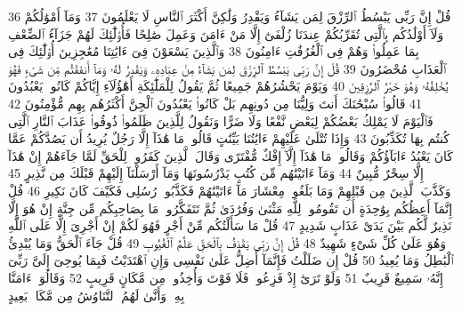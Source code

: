 {\tiny\colorbox{cl_aya}{36}} قُلْ إِنَّ رَبِّى يَبْسُطُ ٱلرِّزْقَ لِمَن يَشَآءُ وَيَقْدِرُ وَلَٰكِنَّ أَكْثَرَ ٱلنَّاسِ لَا يَعْلَمُونَ
{\tiny\colorbox{cl_aya}{37}} وَمَآ أَمْوَٰلُكُمْ وَلَآ أَوْلَٰدُكُم بِٱلَّتِى تُقَرِّبُكُمْ عِندَنَا زُلْفَىٰٓ إِلَّا مَنْ ءَامَنَ وَعَمِلَ صَٰلِحًا فَأُو۟لَٰٓئِكَ لَهُمْ جَزَآءُ ٱلضِّعْفِ بِمَا عَمِلُوا۟ وَهُمْ فِى ٱلْغُرُفَٰتِ ءَامِنُونَ
{\tiny\colorbox{cl_aya}{38}} وَٱلَّذِينَ يَسْعَوْنَ فِىٓ ءَايَٰتِنَا مُعَٰجِزِينَ أُو۟لَٰٓئِكَ فِى ٱلْعَذَابِ مُحْضَرُونَ
{\tiny\colorbox{cl_aya}{39}} قُلْ إِنَّ رَبِّى يَبْسُطُ ٱلرِّزْقَ لِمَن يَشَآءُ مِنْ عِبَادِهِۦ وَيَقْدِرُ لَهُۥ وَمَآ أَنفَقْتُم مِّن شَىْءٍ فَهُوَ يُخْلِفُهُۥ وَهُوَ خَيْرُ ٱلرَّٰزِقِينَ
{\tiny\colorbox{cl_aya}{40}} وَيَوْمَ يَحْشُرُهُمْ جَمِيعًا ثُمَّ يَقُولُ لِلْمَلَٰٓئِكَةِ أَهَٰٓؤُلَآءِ إِيَّاكُمْ كَانُوا۟ يَعْبُدُونَ
{\tiny\colorbox{cl_aya}{41}} قَالُوا۟ سُبْحَٰنَكَ أَنتَ وَلِيُّنَا مِن دُونِهِم بَلْ كَانُوا۟ يَعْبُدُونَ ٱلْجِنَّ أَكْثَرُهُم بِهِم مُّؤْمِنُونَ
{\tiny\colorbox{cl_aya}{42}} فَٱلْيَوْمَ لَا يَمْلِكُ بَعْضُكُمْ لِبَعْضٍ نَّفْعًا وَلَا ضَرًّا وَنَقُولُ لِلَّذِينَ ظَلَمُوا۟ ذُوقُوا۟ عَذَابَ ٱلنَّارِ ٱلَّتِى كُنتُم بِهَا تُكَذِّبُونَ
{\tiny\colorbox{cl_aya}{43}} وَإِذَا تُتْلَىٰ عَلَيْهِمْ ءَايَٰتُنَا بَيِّنَٰتٍ قَالُوا۟ مَا هَٰذَآ إِلَّا رَجُلٌ يُرِيدُ أَن يَصُدَّكُمْ عَمَّا كَانَ يَعْبُدُ ءَابَآؤُكُمْ وَقَالُوا۟ مَا هَٰذَآ إِلَّآ إِفْكٌ مُّفْتَرًى وَقَالَ ٱلَّذِينَ كَفَرُوا۟ لِلْحَقِّ لَمَّا جَآءَهُمْ إِنْ هَٰذَآ إِلَّا سِحْرٌ مُّبِينٌ
{\tiny\colorbox{cl_aya}{44}} وَمَآ ءَاتَيْنَٰهُم مِّن كُتُبٍ يَدْرُسُونَهَا وَمَآ أَرْسَلْنَآ إِلَيْهِمْ قَبْلَكَ مِن نَّذِيرٍ
{\tiny\colorbox{cl_aya}{45}} وَكَذَّبَ ٱلَّذِينَ مِن قَبْلِهِمْ وَمَا بَلَغُوا۟ مِعْشَارَ مَآ ءَاتَيْنَٰهُمْ فَكَذَّبُوا۟ رُسُلِى فَكَيْفَ كَانَ نَكِيرِ
{\tiny\colorbox{cl_aya}{46}} قُلْ إِنَّمَآ أَعِظُكُم بِوَٰحِدَةٍ أَن تَقُومُوا۟ لِلَّهِ مَثْنَىٰ وَفُرَٰدَىٰ ثُمَّ تَتَفَكَّرُوا۟ مَا بِصَاحِبِكُم مِّن جِنَّةٍ إِنْ هُوَ إِلَّا نَذِيرٌ لَّكُم بَيْنَ يَدَىْ عَذَابٍ شَدِيدٍ
{\tiny\colorbox{cl_aya}{47}} قُلْ مَا سَأَلْتُكُم مِّنْ أَجْرٍ فَهُوَ لَكُمْ إِنْ أَجْرِىَ إِلَّا عَلَى ٱللَّهِ وَهُوَ عَلَىٰ كُلِّ شَىْءٍ شَهِيدٌ
{\tiny\colorbox{cl_aya}{48}} قُلْ إِنَّ رَبِّى يَقْذِفُ بِٱلْحَقِّ عَلَّٰمُ ٱلْغُيُوبِ
{\tiny\colorbox{cl_aya}{49}} قُلْ جَآءَ ٱلْحَقُّ وَمَا يُبْدِئُ ٱلْبَٰطِلُ وَمَا يُعِيدُ
{\tiny\colorbox{cl_aya}{50}} قُلْ إِن ضَلَلْتُ فَإِنَّمَآ أَضِلُّ عَلَىٰ نَفْسِى وَإِنِ ٱهْتَدَيْتُ فَبِمَا يُوحِىٓ إِلَىَّ رَبِّىٓ إِنَّهُۥ سَمِيعٌ قَرِيبٌ
{\tiny\colorbox{cl_aya}{51}} وَلَوْ تَرَىٰٓ إِذْ فَزِعُوا۟ فَلَا فَوْتَ وَأُخِذُوا۟ مِن مَّكَانٍ قَرِيبٍ
{\tiny\colorbox{cl_aya}{52}} وَقَالُوٓا۟ ءَامَنَّا بِهِۦ وَأَنَّىٰ لَهُمُ ٱلتَّنَاوُشُ مِن مَّكَانٍۭ بَعِيدٍ

